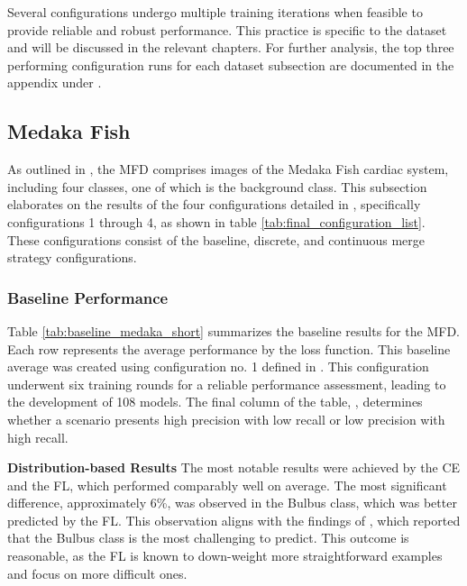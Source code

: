 Several configurations undergo multiple training iterations when feasible to provide reliable and robust performance. This practice is specific to the dataset and will be discussed in the relevant chapters. For further analysis, the top three performing configuration runs for each dataset subsection are documented in the appendix under .
\subsection{Medaka Fish}
\label{subsec:medaka_fish}
As outlined in , the \ac{MFD} comprises images of the Medaka Fish cardiac system, including four classes, one of which is the background class. This subsection elaborates on the results of the four configurations detailed in , specifically configurations 1 through 4, as shown in table \ref{tab:final_configuration_list}. These configurations consist of the baseline, discrete, and continuous merge strategy configurations.
\subsubsection*{Baseline Performance}
Table \ref{tab:baseline_medaka_short} summarizes the baseline results for the \ac{MFD}. Each row represents the average performance by the loss function. This baseline average was created using configuration no. 1 defined in . This configuration underwent six training rounds for a reliable performance assessment, leading to the development of 108 models. The final column of the table, , determines whether a scenario presents high precision with low recall or low precision with high recall.

\textbf{Distribution-based Results}\newline
The most notable results were achieved by the \ac{CE} and the \ac{FL}, which performed comparably well on average. The most significant difference, approximately 6\%, was observed in the Bulbus class, which was better predicted by the \ac{FL}. This observation aligns with the findings of \cite{10.1371/journal.pone.0263656}, which reported that the Bulbus class is the most challenging to predict. This outcome is reasonable, as the \ac{FL} is known to down-weight more straightforward examples and focus on more difficult ones.

